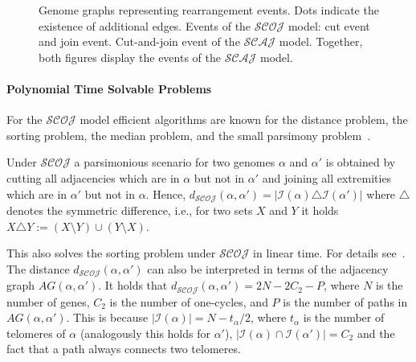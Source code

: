 \documentclass{svmult}
\newcommand{\m}[1]{\mathcal{#1}}
\begin{document}
\begin{figure}
\centering
{}\quad
{}
\caption{Genome graphs representing rearrangement events. Dots indicate the existence of additional edges.  Events of the $\m{SCOJ}$ model: cut event and join event. 
	Cut-and-join event of the $\mathcal{SCAJ}$ model. Together, both figures
	display the events of the $\mathcal{SCAJ}$ model.
}\label{fig:SCAOJ_events}
\end{figure}

\paragraph{Polynomial Time Solvable Problems}

For the $\mathcal{SCOJ}$ model efficient algorithms are known for the distance
problem, the sorting problem, the median problem, and the small parsimony
problem~\cite{Feijao_2011}.

Under $\mathcal{SCOJ}$ a parsimonious scenario for two genomes $\alpha$ and
$\alpha'$ is obtained by cutting all adjacencies which are in $\alpha$ but not
in $\alpha'$ and joining all extremities which are in $\alpha'$ but not in
$\alpha$.
Hence, $d_{\mathcal{SCOJ}}(\alpha,\alpha')=|\mathcal{I}(\alpha) \triangle \mathcal{I}(\alpha')|$ 
where $\triangle$ denotes the symmetric difference,
i.e., for two sets $X$ and $Y$ it holds $X \triangle Y:=(X\setminus Y)\cup(Y
\setminus X)$.

This also solves the sorting problem under $\m{SCOJ}$ in
linear time. For details see~\cite{Feijao_2009}.
The distance $d_{\mathcal{SCOJ}}(\alpha,\alpha')$ can also be interpreted 
in terms of the adjacency graph $AG(\alpha,\alpha')$.
It holds that $d_{\mathcal{SCOJ}}(\alpha,\alpha')=2N-2C_2-P$, where $N$ is the
number of genes, $C_2$ is the number of one-cycles, and $P$ is the
number of paths in $AG(\alpha,\alpha')$. 
This is because 
$|\mathcal{I}(\alpha)|=N-t_\alpha/2$, where $t_\alpha$ is the number of
telomeres of $\alpha$ (analogously this holds for $\alpha'$), $|\mathcal{I}(\alpha)\cap \mathcal{I}(\alpha')|=C_2$ and the
fact that a path always connects two telomeres.
\end{document}
